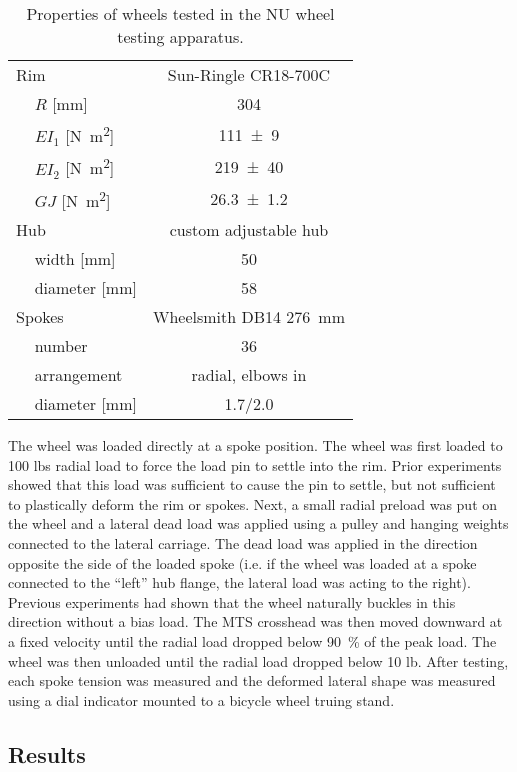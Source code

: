 \documentclass[\rootdir/thesis.tex]{subfiles}
\begin{document}
\begin{table}
\caption{Properties of wheels tested in the NU wheel testing apparatus.}
\label{tab:rad_buckling_wheels}
\begin{tabular}{llc}
\hline
\multicolumn{2}{l}{Rim}& Sun-Ringle CR18-700C\\
\,& $R$ [\si{mm}] & \num{304}\\
\,& $EI_1$ [\si{N.m^2}]     & \num{111+-9}\\
\,& $EI_2$ [\si{N.m^2}]     & \num{219+-40}\\
\,& $GJ$   [\si{N.m^2}]     & \num{26.3+-1.2}\\
\multicolumn{2}{l}{Hub} & custom adjustable hub\\
\,& width [\si{mm}]     & 50\\
\,& diameter [\si{mm}]  & 58\\
\multicolumn{2}{l}{Spokes} & Wheelsmith DB14 \SI{276}{mm}\\
\,& number                 & 36\\
\,& arrangement            & radial, elbows in\\
\,& diameter [\si{mm}]     & 1.7/2.0\\
\hline
\end{tabular}
\end{table}

The wheel was loaded directly at a spoke position. The wheel was first loaded to 100 lbs radial load to force the load pin to settle into the rim. Prior experiments showed that this load was sufficient to cause the pin to settle, but not sufficient to plastically deform the rim or spokes. Next, a small radial preload was put on the wheel and a lateral dead load was applied using a pulley and hanging weights connected to the lateral carriage. The dead load was applied in the direction opposite the side of the loaded spoke (i.e. if the wheel was loaded at a spoke connected to the ``left'' hub flange, the lateral load was acting to the right). Previous experiments had shown that the wheel naturally buckles in this direction without a bias load. The MTS crosshead was then moved downward at a fixed velocity until the radial load dropped below \SI{90}{\percent} of the peak load. The wheel was then unloaded until the radial load dropped below 10 lb. After testing, each spoke tension was measured and the deformed lateral shape was measured using a dial indicator mounted to a bicycle wheel truing stand.

\subsection{Results}
\end{document}
